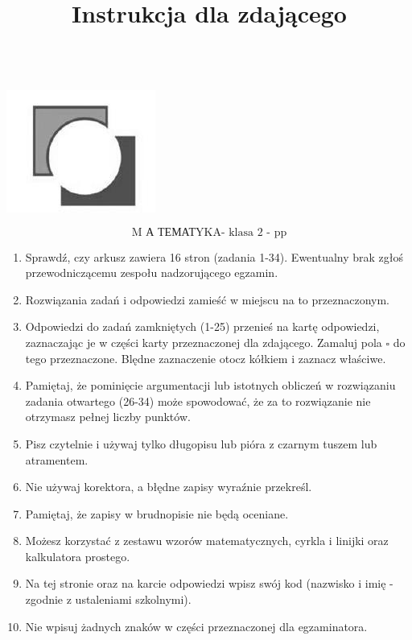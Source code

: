 \documentclass[10pt]{article}
\title{Instrukcja dla zdającego }
\author{}
\date{}
\begin{document}
\maketitle
\(\qquad\)\\
\includegraphics[max width=\textwidth, center]{2024_11_21_cce9c7ad32a1dbcd58dag-01}

\[
\text { M А ТЕМАТYKA- klasa } 2 \text { - pp }
\]

\begin{enumerate}
  \item Sprawdź, czy arkusz zawiera 16 stron (zadania 1-34). Ewentualny brak zgłoś przewodniczącemu zespołu nadzorującego egzamin.
  \item Rozwiązania zadań i odpowiedzi zamieść w miejscu na to przeznaczonym.
  \item Odpowiedzi do zadań zamkniętych (1-25) przenieś na kartę odpowiedzi, zaznaczając je w części karty przeznaczonej dla zdającego. Zamaluj pola \(\square\) do tego przeznaczone. Blędne zaznaczenie otocz kółkiem i zaznacz właściwe.
  \item Pamiętaj, że pominięcie argumentacji lub istotnych obliczeń w rozwiązaniu zadania otwartego (26-34) może spowodować, że za to rozwiązanie nie otrzymasz pełnej liczby punktów.
  \item Pisz czytelnie i używaj tylko długopisu lub pióra z czarnym tuszem lub atramentem.
  \item Nie używaj korektora, a błędne zapisy wyraźnie przekreśl.
  \item Pamiętaj, że zapisy w brudnopisie nie będą oceniane.
  \item Możesz korzystać z zestawu wzorów matematycznych, cyrkla i linijki oraz kalkulatora prostego.
  \item Na tej stronie oraz na karcie odpowiedzi wpisz swój kod (nazwisko i imię - zgodnie z ustaleniami szkolnymi).
  \item Nie wpisuj żadnych znaków w części przeznaczonej dla egzaminatora.
\end{enumerate}
\end{document}
